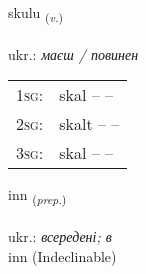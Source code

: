 \documentclass[frontgrid, backgrid]{flacards}\usepackage[]{graphicx}\usepackage[]{xcolor}
\begin{document}
\renewcommand{\blhead}{\vskip5pt {\small\bfseries\footnotesize Sagnorð | дієслово }}
\renewcommand{\bcfoot}{\vskip5pt \hspace{2pt}{\small\bfseries\footnotesize 1K}}


{skulu \small{\textsubscript{(\textit{v.})}} \\[1ex] %
\textphonetic{[skʏːlʏ]} \\
ukr.: \emph{маєш / повинен} \\  [2ex]
\renewcommand*{\arraystretch}{0.8}
\begin{tabular}{p{1cm}l}
\textsc{1sg}: & skal --  --  \\ 
\textsc{2sg}: & skalt --  --  \\ 
\textsc{3sg}: & skal --  --  \\ 
\end{tabular}
}


\renewcommand{\flhead}{\vskip5pt \fboxsep=0pt {\small\bfseries\footnotesize Forsetning | прийменник}}
\renewcommand{\fcfoot}{\vskip5pt \fboxsep=0pt \hspace{2pt}{\small\bfseries\footnotesize 1K}}

\renewcommand{\blhead}{\vskip5pt {\small\bfseries\footnotesize Forsetning | прийменник }}
\renewcommand{\bcfoot}{\vskip5pt \hspace{2pt}{\small\bfseries\footnotesize 1K}}


{inn \small{\textsubscript{(\textit{prep.})}} \\[1ex]
\textphonetic{[ɪn]} \\
ukr.: \emph{всередені; в} \\  [2ex]
inn (Indeclinable)}

\renewcommand{\flhead}{\vskip5pt \fboxsep=0pt {\small\bfseries\footnotesize Lýsingarorð | прикметник}}
\renewcommand{\fcfoot}{\vskip5pt \fboxsep=0pt \hspace{2pt}{\small\bfseries\footnotesize 1K}}

\renewcommand{\blhead}{\vskip5pt {\small\bfseries\footnotesize Lýsingarorð | прикметник }}
\renewcommand{\bcfoot}{\vskip5pt \hspace{2pt}{\small\bfseries\footnotesize 1K}}
\end{document}
